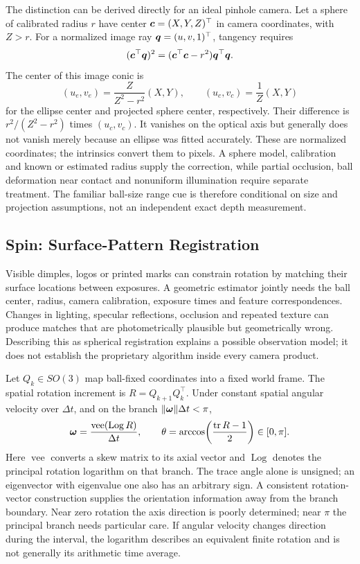 The distinction can be derived directly for an ideal pinhole camera.
Let a sphere of calibrated radius $r$ have center $\bm{c}=(X,Y,Z)^\top$ in camera coordinates, with $Z>r$.
For a normalized image ray $\bm{q}=(u,v,1)^\top$, tangency requires
\begin{equation}
(\bm{c}^{\top}\bm{q})^2
=(\bm{c}^{\top}\bm{c}-r^2)\bm{q}^{\top}\bm{q}.
\end{equation}
The center of this image conic is
\begin{equation}
(u_e,v_e)=\frac{Z}{Z^2-r^2}(X,Y),
\qquad
(u_c,v_c)=\frac{1}{Z}(X,Y)
\end{equation}
for the ellipse center and projected sphere center, respectively.
Their difference is $r^2/(Z^2-r^2)$ times $(u_c,v_c)$.
It vanishes on the optical axis but generally does not vanish merely because an ellipse was fitted accurately.
These are normalized coordinates; the intrinsics convert them to pixels.
A sphere model, calibration and known or estimated radius supply the correction, while partial occlusion, ball deformation near contact and nonuniform illumination require separate treatment.
The familiar ball-size range cue is therefore conditional on size and projection assumptions, not an independent exact depth measurement.

\subsection{Spin: Surface-Pattern Registration}
\label{sec:dimplespin}

Visible dimples, logos or printed marks can constrain rotation by matching their surface locations between exposures.
A geometric estimator jointly needs the ball center, radius, camera calibration, exposure times and feature correspondences.
Changes in lighting, specular reflections, occlusion and repeated texture can produce matches that are photometrically plausible but geometrically wrong.
Describing this as spherical registration explains a possible observation model; it does not establish the proprietary algorithm inside every camera product.

Let $Q_k\in SO(3)$ map ball-fixed coordinates into a fixed world frame.
The spatial rotation increment is $R=Q_{k+1}Q_k^\top$.
Under constant spatial angular velocity over $\Delta t$, and on the branch $\|\bm{\omega}\|\Delta t<\pi$,
\begin{equation}
\label{eq:rotangle}
\bm{\omega}=\frac{\operatorname{vee}(\operatorname{Log}R)}{\Delta t},
\qquad
\theta=\arccos\!\left(\frac{\operatorname{tr}R-1}{2}\right)\in[0,\pi].
\end{equation}
Here $\operatorname{vee}$ converts a skew matrix to its axial vector and $\operatorname{Log}$ denotes the principal rotation logarithm on that branch.
The trace angle alone is unsigned; an eigenvector with eigenvalue one also has an arbitrary sign.
A consistent rotation-vector construction supplies the orientation information away from the branch boundary.
Near zero rotation the axis direction is poorly determined; near $\pi$ the principal branch needs particular care.
If angular velocity changes direction during the interval, the logarithm describes an equivalent finite rotation and is not generally its arithmetic time average.

